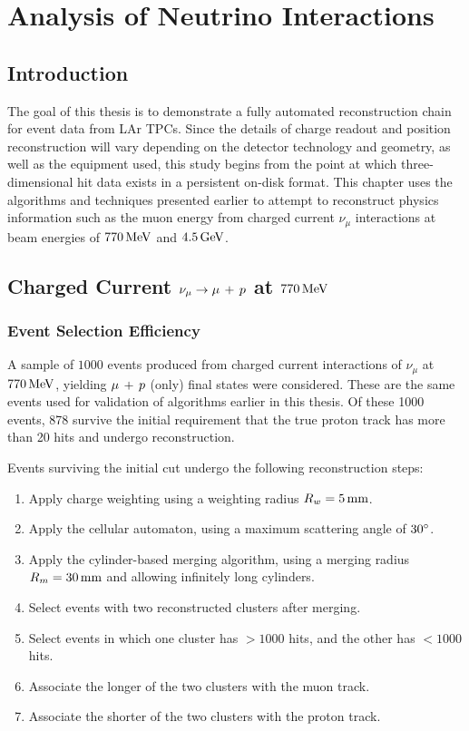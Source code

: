\chapter{Analysis of Neutrino Interactions}\label{chapter:Analysis}
\section{Introduction}
The goal of this thesis is to demonstrate a fully automated reconstruction chain for event data from \ac{LAr TPC}s. Since the details of charge readout and position reconstruction will vary depending on the detector technology and geometry, as well as the equipment used, this study begins from the point at which three-dimensional hit data exists in a persistent on-disk format. This chapter uses the algorithms and techniques presented earlier to attempt to reconstruct physics information such as the muon energy from charged current $\nu_\mu$ interactions at beam energies of $770\,\mathrm{MeV}$ and $4.5\,\mathrm{GeV}$.

\section{Charged Current \texorpdfstring{$\nu_\mu \rightarrow \mu\,+\,p$}{ν\_μ → μ + p} at $770\,\mathrm{MeV}$}
\subsection{Event Selection Efficiency}
A sample of $1000$ events produced from charged current interactions of $\nu_\mu$ at $770\,\mathrm{MeV}$, yielding $\mu\,+\,p$ (only) final states were considered. These are the same events used for validation of algorithms earlier in this thesis. Of these 1000 events, 878 survive the initial requirement that the true proton track has more than 20 hits and undergo reconstruction. 

Events surviving the initial cut undergo the following reconstruction steps:
\begin{enumerate}
    \item Apply charge weighting using a weighting radius $R_w=5\,\mathrm{mm}$.
    \item Apply the cellular automaton, using a maximum scattering angle of $30^\circ$.
    \item Apply the cylinder-based merging algorithm, using a merging radius $R_m=30\,\mathrm{mm}$ and allowing infinitely long cylinders.
    \item Select events with two reconstructed clusters after merging.
    \item Select events in which one cluster has $> 1000$ hits, and the other has $< 1000$ hits.
    \item Associate the longer of the two clusters with the muon track.
    \item Associate the shorter of the two clusters with the proton track.
\end{enumerate}

